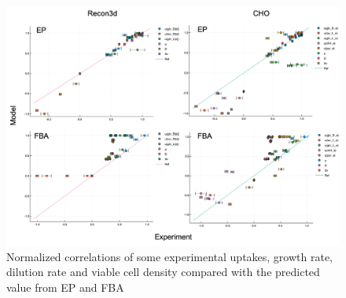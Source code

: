 	\begin{figure}
		\includegraphics[scale = 0.5]{rich_medium_3}
		\caption{Normalized correlations of some experimental uptakes, growth rate, dilution rate and viable cell density compared with the predicted value from EP and FBA}
		
	\end{figure}